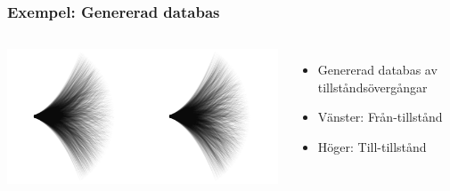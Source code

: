 \documentclass[]{beamer}
\renewcommand{\ae}{\"{a}}
\renewcommand{\oe}{\"{o}}
\begin{document}
\begin{frame}
  \frametitle{Exempel: Genererad databas}
  \begin{columns}[c]
    \column{2in}
    \includegraphics[width=1\textwidth]{database_gwhisker_spline3_n2048_from_to_fixed.png}
    
    \column{2in}
    \begin{itemize}
      \item Genererad databas av tillst\aa nds\oe verg\aa ngar
      \item V\ae nster: Fr\aa n-tillst\aa nd
      \item H\oe ger: Till-tillst\aa nd
    \end{itemize}
  \end{columns}
\end{frame}
\end{document}
